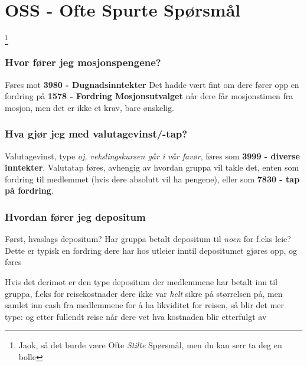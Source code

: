 \section{OSS - Ofte Spurte Spørsmål}
\let\thefootnote\relax\footnote{Jaok, så det burde være Ofte \emph{Stilte} Spørsmål, men du kan serr ta deg en bolle}

\subsubsection*{Hvor fører jeg mosjonspengene?}
Føres mot {\bfseries 3980 - Dugnadsinntekter} \newline
Det hadde vært fint om dere fører opp en fordring på {\bfseries 1578 - Fordring Mosjonsutvalget} når dere får mosjonstimen fra mosjon, men det er ikke et krav, bare ønskelig.

\subsubsection*{Hva gjør jeg med valutagevinst/-tap?}
Valutagevinst, type \emph{oj, vekslingskursen går i vår favør}, føres som {\bfseries 3999 - diverse inntekter}. \newline
Valutatap føres, avhengig av hvordan gruppa vil takle det, enten som fordring til medlemmet (hvis dere absolutt vil ha pengene), eller som {\bfseries 7830 - tap på fordring}.

\subsubsection*{Hvordan fører jeg depositum}
Først, hvaslags depositum? Har gruppa betalt depositum til \emph{noen} for f.eks leie? Dette er typisk en fordring dere har hos utleier inntil depositumet gjøres opp, og føres 

Hvis det derimot er den type depositum der medlemmene har betalt inn til gruppa, f.eks for reisekostnader dere ikke var \emph{helt} sikre på størrelsen på, men samlet inn cash fra medlemmene for å ha likviditet for reisen, så blir det mer type:
og etter fullendt reise når dere vet hva kostnaden blir
etterfulgt av
